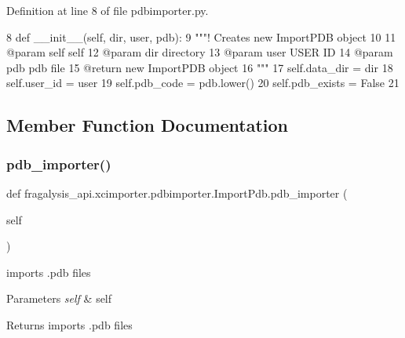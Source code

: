 Definition at line 8 of file pdbimporter.\+py.


\begin{DoxyCode}
8     \textcolor{keyword}{def }\_\_init\_\_(self, dir, user, pdb):
9         \textcolor{stringliteral}{"""! Creates new ImportPDB object}
10 \textcolor{stringliteral}{}
11 \textcolor{stringliteral}{        @param self self}
12 \textcolor{stringliteral}{        @param dir directory}
13 \textcolor{stringliteral}{        @param user USER ID}
14 \textcolor{stringliteral}{        @param pdb pdb file}
15 \textcolor{stringliteral}{        @return new ImportPDB object}
16 \textcolor{stringliteral}{        """}
17         self.data\_dir = dir
18         self.user\_id = user
19         self.pdb\_code = pdb.lower()
20         self.pdb\_exists = \textcolor{keyword}{False}
21 
\end{DoxyCode}


\subsection{Member Function Documentation}
\mbox{\label{classfragalysis__api_1_1xcimporter_1_1pdbimporter_1_1_import_pdb_acd432818f58309c5a65c92db9ca08ada}} 
\subsubsection{\texorpdfstring{pdb\+\_\+importer()}{pdb\_importer()}}
{\footnotesize\ttfamily def fragalysis\+\_\+api.\+xcimporter.\+pdbimporter.\+Import\+Pdb.\+pdb\+\_\+importer (\begin{DoxyParamCaption}\item[{}]{self }\end{DoxyParamCaption})}



imports .pdb files 


\begin{DoxyParams}{Parameters}
{\em self} & self \\
\hline
\end{DoxyParams}
\begin{DoxyReturn}{Returns}
imports .pdb files 
\end{DoxyReturn}


